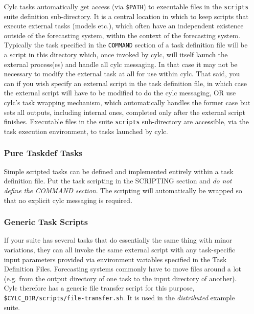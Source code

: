 \documentclass[11pt,a4paper]{article}
\begin{document}
Cylc tasks automatically get access (via \lstinline=$PATH=) to
executable files in the \lstinline=scripts= suite definition
sub-directory. It is a central location in which to keep scripts that
execute external tasks (models etc.), which often have an independent
existence outside of the forecasting system, within the context of the
forecasting system. Typically the task specified in the
\lstinline=COMMAND= section of a task definition file will be a script
in this directory which, once invoked by cylc, will itself launch the
external process(es) and handle all cylc messaging. In that case it may
not be necessary to modify the external task at all for use within cylc.
That said, you can if you wish specify an external script in the task
definition file, in which case the external script will have to be
modified to do the cylc messaging, OR use cylc's task wrapping
mechanism, which automatically handles the former case but sets all
outputs, including internal ones, completed only after the external
script finishes. Executable files in the suite \lstinline=scripts=
sub-directory are accessible, via the task execution environment, to
tasks launched by cylc. 

\subsubsection{Pure Taskdef Tasks}

Simple scripted tasks can be defined and implemented entirely within a
task definition file. Put the task scripting in the SCRIPTING section
and {\em do not define the COMMAND section}. The scripting will
automatically be wrapped so that no explicit cylc messaging is required.

\subsubsection{Generic Task Scripts}

If your suite has several tasks that do essentially the same thing with
minor variations, they can all invoke the same external script with 
any task-specific input parameters provided via environment variables
specified in the Task Definition Files. Forecasting systems commonly
have to move files around a lot (e.g. from the output directory of one
task to the input directory of another). Cylc therefore has a generic
file transfer script for this purpose,
\lstinline=$CYLC_DIR/scripts/file-transfer.sh=. It is used in the
{\em distributed} example suite. 
\end{document}
